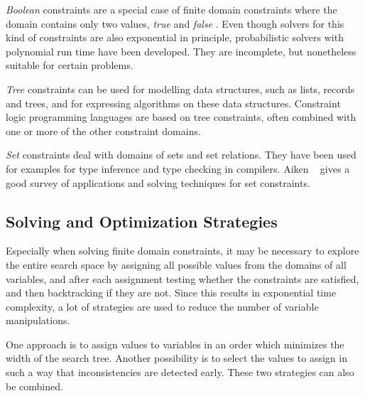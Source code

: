 {\em Boolean}%
%
 constraints are a special case of finite
domain
constraints where the domain contains only two values, {\em true}%
 and
{\em false}%
.  Even though solvers for this kind of constraints are
also exponential in principle, probabilistic solvers%
 with polynomial run time have been
developed.  They are incomplete, but nonetheless suitable for certain
problems.

{\em Tree}%
%
%
 constraints can be used for modelling data structures,
such as lists, records and trees, and for expressing algorithms on
these data structures.  Constraint logic programming languages are
based on tree constraints, often combined with one or more of the
other constraint domains.

{\em Set}%
%
 constraints deal with domains of sets and set
relations.  They have been used for examples for type inference%
%
 and
type checking%
 in compilers.  Aiken%
~\cite{aiken94setconstraints} gives a good survey of
applications and solving techniques for set constraints.


\subsection{Solving and Optimization Strategies}


Especially when solving finite domain constraints, it may be necessary
to explore the entire search space by assigning all possible values
from the domains of all variables, and after each assignment testing
whether the constraints are satisfied, and then backtracking if they
are not.  Since this results in exponential time complexity, a lot of
strategies are used to reduce the number of variable manipulations.

One approach is to assign values to variables in an order which
minimizes the width of the search tree.  Another possibility is to
select the values to assign in such a way that inconsistencies are
detected early.  These two strategies can also be combined.


